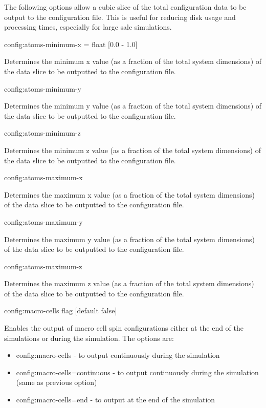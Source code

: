 The following options allow a cubic slice of the total configuration data to be output to the configuration file. This is useful for reducing disk usage and processing times, especially for large sale simulations.

{\zicf config:atoms-minimum-x = float [0.0 - 1.0]} Determines the minimum x value (as a fraction of the total system dimensions) of the data slice to be outputted to the configuration file.

{\zicf config:atoms-minimum-y} Determines the minimum y value (as a fraction of the total system dimensions) of the data slice to be outputted to the configuration file.

{\zicf config:atoms-minimum-z} Determines the minimum z value (as a fraction of the total system dimensions) of the data slice to be outputted to the configuration file.

{\zicf config:atoms-maximum-x} Determines the maximum x value (as a fraction of the total system dimensions) of the data slice to be outputted to the configuration file.

{\zicf config:atoms-maximum-y} Determines the maximum y value (as a fraction of the total system dimensions) of the data slice to be outputted to the configuration file.

{\zicf config:atoms-maximum-z} Determines the maximum z value (as a fraction of the total system dimensions) of the data slice to be outputted to the configuration file.

{\zicf config:macro-cells flag [default false]} Enables the output of macro cell spin configurations either at the end of the simulations or during the simulation. The options are:

\begin{itemize}
  \item[] config:macro-cells - to output continuously during the simulation
  \item[] config:macro-cells=continuous - to output continuously during the simulation (same as previous option)
  \item[] config:macro-cells=end - to output at the end of the simulation
\end{itemize}

